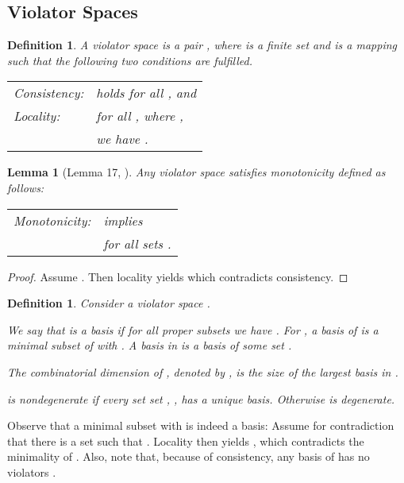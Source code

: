 \documentclass[12pt]{article}
\newtheorem{lemma2}[theorem2]{Lemma}
\newenvironment{lemma}{\begin{lemma2}}{\end{lemma2}}
\newtheorem{definition2}[theorem2]{Definition}
\newenvironment{definition}{\begin{definition2}}{\end{definition2}}
\theoremstyle{remark}
\let\newItemize=\itemize
\renewenvironment{itemize}{\newItemize\itemsep=0.0cm}{\endlist}
\begin{document}
\subsection{Violator Spaces}

\begin{definition}
\label{def:violatorspace}
A \emph{violator space} is a pair , where  is a finite set and 
is a mapping  such that the following two conditions are fulfilled.

\vspace{0.2cm}
\begin{tabular}{ll}
	Consistency: &  holds for all , and \\
	Locality: & for all , where ,\\
	& we have .
\end{tabular}  
\end{definition}

\begin{lemma}[Lemma 17, \cite{journals/dam/GartnerMRS08}]
\label{lemma:monotonicity}
Any violator space  satisfies \emph{monotonicity} defined as follows:

\vspace{0.2cm}
\begin{tabular}{ll}
	Monotonicity: &  implies \\
	& for all sets .
\end{tabular}  
\end{lemma}
\begin{proof}
Assume . Then locality yields
 which contradicts consistency.
\end{proof}

\begin{definition}
Consider a violator space .
\begin{itemize}
\item[(i)]We say that  is a \emph{basis}
if for all proper subsets  we have . For , a basis of  is a minimal subset  of  with .
A basis in  is a basis of some set .
\item[(ii)] The \emph{combinatorial dimension} of , denoted by ,
is the size of the largest basis in .
\item[(iii)]  is \emph{nondegenerate} if every set set , ,
has a unique basis. Otherwise  is \emph{degenerate}.
\end{itemize}
\end{definition}

Observe that a minimal subset  with  is indeed a basis:
Assume for contradiction that there is a set  such that .
Locality then yields , which contradicts the minimality of .
Also, note that, because of consistency, any basis  of  has no violators .
\end{document}
